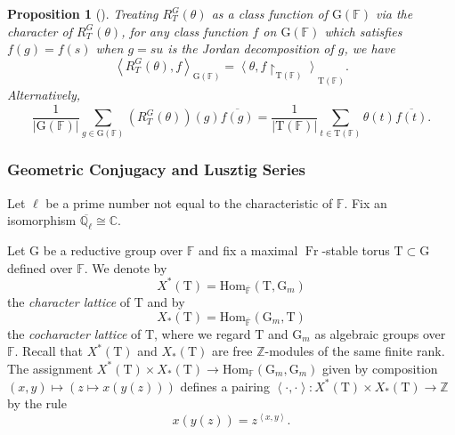 \documentclass[12pt, reqno]{amsart}
\newtheorem{proposition}[theorem]{Proposition}
\theoremstyle{definition}
\theoremstyle{definition}
\theoremstyle{definition}
\newcommand{\zIntegers}{\mathbb{Z}}
\newcommand{\cComplex}{\mathbb{C}}
\newcommand{\Hom}{\mathrm{Hom}}
\newcommand{\conjugate}[1]{\overline{#1}}
\newcommand{\sizeof}[1]{\left|#1\right|}
\newcommand{\innerproduct}[2]{\left\langle #1,#2\right\rangle}
\newcommand{\finiteField}{\mathbb{F}}
\newcommand{\algebraicClosure}[1]{\overline{#1}}
\newcommand{\Frobenius}{\operatorname{Fr}}
\newcommand{\multiplcativeScheme}{\algebraicGroup{G}_m}
\newcommand{\ladicnumbers}{\algebraicClosure{\mathbb{Q}_{\ell}}}
\newcommand{\algebraicGroup}[1]{\boldsymbol{\mathrm{#1}}}
\newcommand{\CharacterLattice}[1]{X^{\ast}\left(#1\right)}
\newcommand{\CocharacterLattice}[1]{X_{\ast}\left(#1\right)}
\begin{document}
\begin{proposition}[{\cite[Corollary 12.6]{DigneMichel1991}}]
\label{prop:semisimple_pair_with_RTtheta}
Treating $R_T^G(\theta)$ as a class function of $\algebraicGroup{G}(\finiteField)$ via the character of $R_T^G(\theta)$, for any class function $f$ on $\algebraicGroup{G}(\finiteField)$ which satisfies $f(g) = f(s)$ when $g=su$ is the Jordan decomposition of $g$, we have
\[
	\innerproduct{R_T^G(\theta)}{f}_{\algebraicGroup{G}(\finiteField)} = \innerproduct{\theta}{f\restriction_{\algebraicGroup{T}(\finiteField)}}_{\algebraicGroup{T}(\finiteField)}.
\]
Alternatively,
\[
	\frac{1}{\sizeof{\algebraicGroup{G}(\finiteField)}}\sum_{g \in \algebraicGroup{G}(\finiteField)}\left(R_T^G(\theta)\right)(g)\conjugate{f(g)} = \frac{1}{\sizeof{\algebraicGroup{T}(\finiteField)}}\sum_{t \in  \algebraicGroup{T}(\finiteField)} \theta(t)\conjugate{f(t)}.
\]
\end{proposition}

\subsubsection{Geometric Conjugacy and Lusztig Series}
Let $\ell$ be a prime number not equal to the characteristic of $\finiteField$. Fix an isomorphism $\ladicnumbers \cong \cComplex$.

Let $\algebraicGroup{G}$ be a reductive group over $\finiteField$ and fix a maximal $\Frobenius$-stable torus $\algebraicGroup{T} \subset \algebraicGroup{G}$ defined over $\finiteField$. We denote by $$\CharacterLattice{\algebraicGroup{T}} = \Hom_{\algebraicClosure{\finiteField}}\left(\algebraicGroup{T}, \multiplcativeScheme\right)$$ the \emph{character lattice} of $\algebraicGroup{T}$ and by $$\CocharacterLattice{\algebraicGroup{T}} = \Hom_{\algebraicClosure{\finiteField}}\left(\multiplcativeScheme, \algebraicGroup{T}\right)$$ the \emph{cocharacter lattice} of $\algebraicGroup{T}$, where we regard $\algebraicGroup{T}$ and $\multiplcativeScheme$ as algebraic groups over $\finiteField$. Recall that $\CharacterLattice{\algebraicGroup{T}}$ and $\CocharacterLattice{\algebraicGroup{T}}$ are free $\zIntegers$-modules of the same finite rank. The assignment $\CharacterLattice{\algebraicGroup{T}} \times \CocharacterLattice{\algebraicGroup{T}} \to \Hom_{\finiteField}\left(\multiplcativeScheme, \multiplcativeScheme\right)$ given by composition $\left(x,y\right) \mapsto \left(z \mapsto x\left(y\left(z\right)\right)\right)$ defines a pairing $\innerproduct{\cdot}{\cdot} \colon \CharacterLattice{\algebraicGroup{T}} \times \CocharacterLattice{\algebraicGroup{T}} \to \zIntegers$ by the rule $$x\left(y\left(z\right)\right) = z^{\innerproduct{x}{y}}.$$
\end{document}
